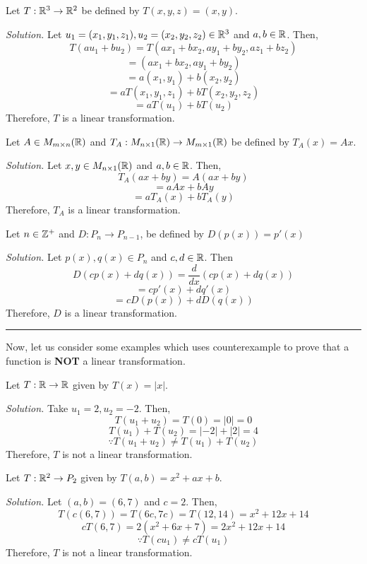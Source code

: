 \begin{example}
Let $T: \mathbb{R}^3 \to \mathbb{R}^2$ be defined by $T(x, y, z) = (x, y)$.

\textit{Solution.} Let $u_1 = (x_1, y_1, z_1), u_2 = (x_2, y_2, z_2) \in \mathbb{R}^3$ and $a, b \in \mathbb{R}$. Then,
$$T(au_1 + bu_2) = T(ax_1 + bx_2, ay_1 + by_2, az_1 + bz_2)$$
$$=(ax_1 + bx_2, ay_1 + by_2)$$
$$= a(x_1, y_1) + b(x_2, y_2)$$
$$=aT(x_1, y_1, z_1) + bT(x_2, y_2, z_2)$$
$$= aT(u_1) + bT(u_2)$$
Therefore, $T$ is a linear transformation.
\end{example}

\newpage
\begin{example}
Let $A \in M_{m \times n}(\mathbb{R})$ and $T_A: M_{n \times 1}(\mathbb{R}) \to M_{m \times 1}(\mathbb{R})$ be defined by $T_A(x) = Ax$.

\textit{Solution.} Let $x, y \in M_{n \times 1}(\mathbb{R})$ and $a, b \in \mathbb{R}$. Then,
$$T_A(ax + by) = A(ax + by)$$
$$=aAx + bAy$$
$$=aT_A(x) + bT_A(y)$$
Therefore, $T_A$ is a linear transformation.
\end{example}

\begin{example}
Let $n \in \mathbb{Z}^+$ and $D: P_n \to P_{n-1}$, be defined by $D(p(x)) = p\prime(x)$

\textit{Solution.} Let $p(x), q(x) \in P_n$ and $c, d \in \mathbb{R}$. Then
$$D(cp(x) + dq(x)) = \frac{d}{dx}(cp(x) + dq(x))$$
$$=cp'(x) + dq'(x)$$
$$=cD(p(x)) + dD(q(x))$$
Therefore, $D$ is a linear transformation.
\end{example}

\noindent\rule{\textwidth}{0.4pt}

Now, let us consider some examples which uses counterexample to prove that a function is \textbf{NOT} a linear transformation.

\begin{example}
Let $T: \mathbb{R} \to \mathbb{R}$ given by $T(x) = |x|$.

\textit{Solution.} Take $u_1 = 2, u_2 = -2$. Then,
$$T(u_1 + u_2) = T(0) = |0| = 0$$
$$T(u_1) + T(u_2) = |-2| + |2| = 4$$
$$\because T(u_1 + u_2) \neq T(u_1) + T(u_2)$$
Therefore, $T$ is not a linear transformation.
\end{example}

\begin{example}
Let $T: \mathbb{R}^2 \to P_2$ given by $T(a, b) = x^2 + ax + b$.

\textit{Solution.} Let $(a, b) = (6, 7)$ and $c = 2$. Then,
$$T(c(6, 7)) = T(6c, 7c) = T(12, 14) = x^2 + 12x + 14$$
$$cT(6, 7) = 2(x^2 + 6x + 7) = 2x^2 + 12x + 14$$
$$\because T(cu_1) \neq cT(u_1)$$
Therefore, $T$ is not a linear transformation.
\end{example}

